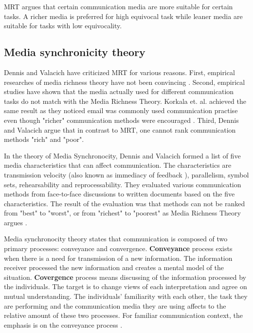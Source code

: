 \documentclass[conference]{IEEEtran}
\begin{document}
MRT argues that certain communication media are more suitable for certain tasks. A richer media is preferred for high equivocal task while leaner media are suitable for tasks with low equivocality. 

\subsection{Media synchronicity theory}

Dennis and Valacich have criticized MRT for various reasons. First, empirical researches of media richness theory have not been convincing \cite{1998dennis} \cite{1997elshinnawy}. Second, empirical studies have shown that the media actually used for different communication tasks do not match with the Media Richness Theory. Korkala et. al. achieved the same result as they noticed email was commonly used communication practise even though "richer" communication methods were encouraged \cite{2006korkala}. Third, Dennis and Valacich argue that in contrast to MRT, one cannot rank communication methods "rich" and "poor". \cite{1999dennis}

In the theory of Media Synchronocity, Dennis and Valacich formed a list of five media characteristics that can affect communication. The characteristics are transmission velocity (also known as immediacy of feedback \cite{1999dennis}), parallelism, symbol sets, rehearsability and reprocessability. They evaluated various communication methods from face-to-face discussions to written documents based on the five characteristics. The result of the evaluation was that methods can not be ranked from "best" to "worst", or from "richest" to "poorest" as Media Richness Theory argues \cite{2008dennis}. 

Media synchronocity theory states that communication is composed of two primary processes: conveyance and convergence. \textbf{Conveyance} process exists when there is a need for transmission of a new information. The information receiver processed the new information and creates a mental model of the situation. \textbf{Covergence} process means discussing of the information processed by the individuals. The target is to change views of each interpretation and agree on mutual understanding. The individuals' familiarity with each other, the task they are performing and the communication media they are using affects to the relative amount of these two processes. For familiar communication context, the emphasis is on the conveyance process \cite{2008dennis}.
\end{document}
